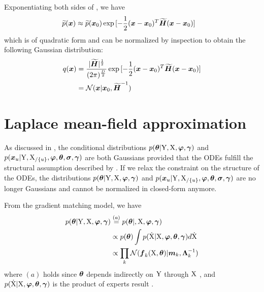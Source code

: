 Exponentiating both sides of , we have 
\begin{align}
    \widetilde{p}(\boldsymbol{x}) 
    & \approx \widetilde{p}(\boldsymbol{x}_0) 
        \exp{[
            - \frac{1}{2}(\boldsymbol{x} - \boldsymbol{x}_0)^T\boldsymbol{\widetilde{H}}(\boldsymbol{x} - \boldsymbol{x}_0)
        ]}
    \label{eq-laplace-p-exp}
\end{align}
which is of quadratic form and can be normalized by inspection to obtain the following Gaussian distribution:
\begin{align}
    q(\boldsymbol{x}) 
    & = \frac{\lvert \boldsymbol{\widetilde{H}} \rvert^{\frac{1}{2}}}{(2\pi)^{\frac{
    D}{2}}} \exp{[
        - \frac{1}{2}(\boldsymbol{x} - \boldsymbol{x}_0)^T\boldsymbol{\widetilde{H}}(\boldsymbol{x} - \boldsymbol{x}_0)
    ]}
    \nonumber
    \\
    & = \mathcal{N}(\boldsymbol{x}\vert \boldsymbol{x}_0,
    \boldsymbol{\widetilde{H}}^{-1})
    \label{eq-laplace-q}
\end{align}

\section{Laplace mean-field approximation}
\label{sec-laplace-mean-field}

As discussed in , the conditional distributions $p(\boldsymbol{\theta}\vert\mathrm{Y},\mathrm{X},\boldsymbol{\varphi},\boldsymbol{\gamma})$  and $p(\boldsymbol{x}_{u}\vert\mathrm{Y},\mathrm{X}_{/\{u\}},\boldsymbol{\varphi},\boldsymbol{\theta},\boldsymbol{\sigma},\boldsymbol{\gamma})$  are both Gaussians provided that the ODEs fulfill the structural assumption described by .
If we relax the constraint on the structure of the ODEs, the distributions $p(\boldsymbol{\theta}\vert\mathrm{Y},\mathrm{X},\boldsymbol{\varphi},\boldsymbol{\gamma})$ and $p(\boldsymbol{x}_{u}\vert\mathrm{Y},\mathrm{X}_{/\{u\}},\boldsymbol{\varphi},\boldsymbol{\theta},\boldsymbol{\sigma},\boldsymbol{\gamma})$ are no longer Gaussians and cannot be normalized in closed-form anymore.

From the gradient matching model, we have
\begin{align}
    p(\boldsymbol{\theta}\vert\mathrm{Y},\mathrm{X},\boldsymbol{\varphi},\boldsymbol{\gamma}) 
    & \stackrel{(a)}{=} 
    p(\boldsymbol{\theta}\vert,\mathrm{X},\boldsymbol{\varphi},\boldsymbol{\gamma}) 
    \nonumber
    \\
    & \propto 
    p(\boldsymbol{\theta})\int{p(\mathrm{\dot{X}}\vert\mathrm{X},\boldsymbol{\ensuremath{\varphi}},\boldsymbol{\theta},\boldsymbol{\gamma})d\mathrm{\dot{X}}}
    \nonumber
    \\
    & \propto 
    \prod_k{\mathcal{N}(\boldsymbol{f}_{k}(\mathrm{X}, \boldsymbol{\theta})\vert\boldsymbol{m}_{k},\boldsymbol{\Lambda}_{k}^{-1})}
    \label{eq-laplace-theta-objective}
\end{align}
where $(a)$ holds since $\boldsymbol{\theta}$ depends indirectly on $\mathrm{Y}$ through $\mathrm{X}$ \citep{gorbach2017scalable}, and $p(\mathrm{\dot{X}}\vert\mathrm{X},\boldsymbol{\varphi},\boldsymbol{\theta},\boldsymbol{\gamma})$ is the product of experts result .

